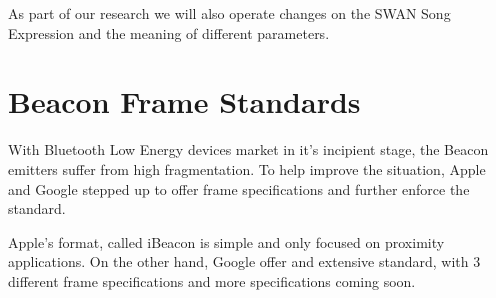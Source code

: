 As part of our research we will also operate changes on the SWAN Song Expression and the meaning of different parameters.

\section{Beacon Frame Standards}
With Bluetooth Low Energy devices market in it's incipient stage, the Beacon  emitters suffer from high fragmentation.
To help improve the situation, Apple and Google stepped up to offer frame specifications and further enforce the standard.

Apple's format, called iBeacon is simple and only focused on proximity applications.
On the other hand, Google offer and extensive standard, with 3 different frame specifications and more specifications coming soon.
